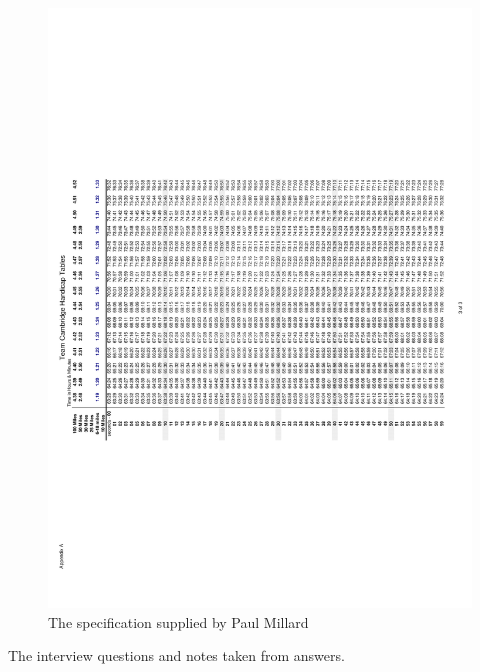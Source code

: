 \begin{figure}[H]
    \includegraphics[width=\textwidth]{./TeamCambridgeSpec/page9.pdf}
     \caption{The specification supplied by Paul Millard} \label{fig:Specification}
\end{figure}


The interview questions and notes taken from answers.

